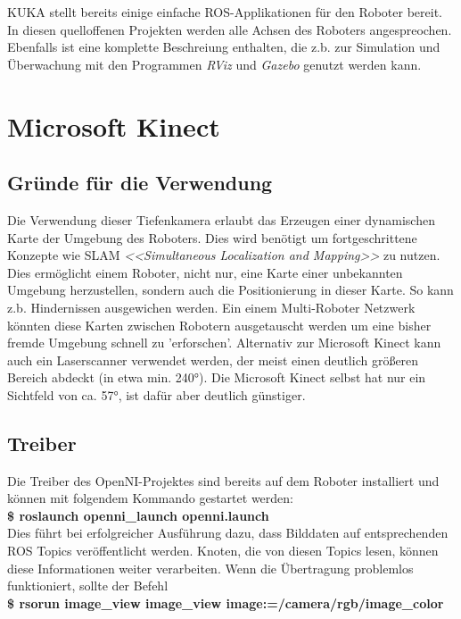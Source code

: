 \documentclass[9pt,a4paper,DIV=11]{scrartcl}
\begin{document}
KUKA stellt bereits einige einfache ROS-Applikationen für den Roboter bereit. In diesen quelloffenen Projekten werden alle Achsen des Roboters angespreochen. Ebenfalls ist eine komplette Beschreiung enthalten, die z.b. zur Simulation und Überwachung mit den Programmen \textit{RViz} und \textit{Gazebo} genutzt werden kann.

\newpage
\section{Microsoft Kinect}
\subsection{Gründe für die Verwendung}
Die Verwendung dieser Tiefenkamera erlaubt das Erzeugen einer dynamischen Karte der Umgebung des Roboters. Dies wird benötigt um fortgeschrittene Konzepte wie SLAM \textit{<<Simultaneous Localization and Mapping>>} zu nutzen. Dies ermöglicht einem Roboter, nicht nur, eine Karte einer unbekannten Umgebung herzustellen, sondern auch die Positionierung in dieser Karte. So kann z.b. Hindernissen ausgewichen werden. Ein einem Multi-Roboter Netzwerk könnten diese Karten zwischen Robotern ausgetauscht werden um eine bisher fremde Umgebung schnell zu 'erforschen'. Alternativ zur Microsoft Kinect kann auch ein Laserscanner verwendet werden, der meist einen deutlich größeren Bereich abdeckt (in etwa min. 240°). Die Microsoft Kinect selbst hat nur ein Sichtfeld von ca. 57°, ist dafür aber deutlich günstiger.

\subsection{Treiber}

Die Treiber des OpenNI-Projektes sind bereits auf dem Roboter installiert und können mit folgendem Kommando gestartet werden:\\

\textbf{\$ roslaunch openni\_launch openni.launch} \\

Dies führt bei erfolgreicher Ausführung dazu, dass Bilddaten auf entsprechenden ROS Topics veröffentlicht werden. Knoten, die von diesen Topics lesen, können diese Informationen weiter verarbeiten. Wenn die Übertragung problemlos funktioniert, sollte der Befehl\\

\textbf{\$ rsorun image\_view image\_view image:=/camera/rgb/image\_color} \\
\end{document}
